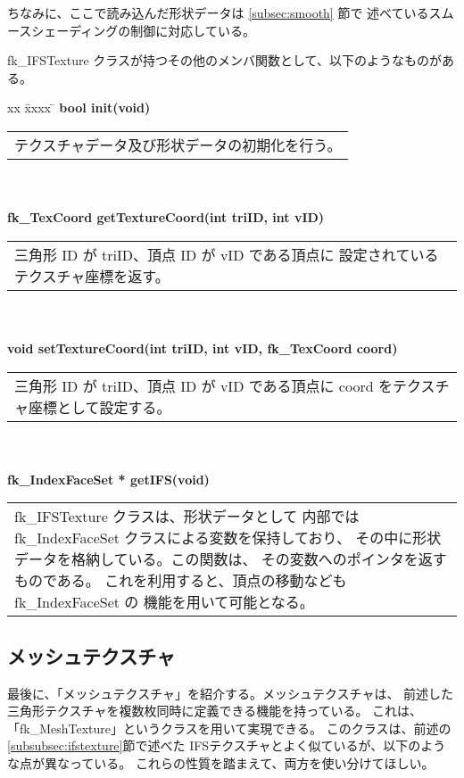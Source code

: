 ちなみに、ここで読み込んだ形状データは \ref{subsec:smooth} 節で
述べているスムースシェーディングの制御に対応している。

fk\_IFSTexture クラスが持つその他のメンバ関数として、以下のようなものがある。
\begin{tabbing}
xx \= xxxx \= \kill
\> \textbf{bool init(void)} \\
	\> \> \begin{tabular}{p{15cm}}
		テクスチャデータ及び形状データの初期化を行う。
	\end{tabular} \\ \\

\> \textbf{fk\_TexCoord getTextureCoord(int triID, int vID)} \\
	\> \> \begin{tabular}{p{15cm}}
		三角形 ID が triID、頂点 ID が vID である頂点に
		設定されているテクスチャ座標を返す。
	\end{tabular} \\ \\

\> \textbf{void setTextureCoord(int triID, int vID, fk\_TexCoord coord)} \\
	\> \> \begin{tabular}{p{15cm}}
		三角形 ID が triID、頂点 ID が vID である頂点に
		coord をテクスチャ座標として設定する。
	\end{tabular} \\ \\

\> \textbf{fk\_IndexFaceSet * getIFS(void)} \\
	\> \> \begin{tabular}{p{15cm}}
		fk\_IFSTexture クラスは、形状データとして
		内部では fk\_IndexFaceSet クラスによる変数を保持しており、
		その中に形状データを格納している。この関数は、
		その変数へのポインタを返すものである。
		これを利用すると、頂点の移動なども fk\_IndexFaceSet の
		機能を用いて可能となる。
	\end{tabular}
\end{tabbing}

\subsection{メッシュテクスチャ}
最後に、「メッシュテクスチャ」を紹介する。メッシュテクスチャは、
前述した三角形テクスチャを複数枚同時に定義できる機能を持っている。
これは、「fk\_MeshTexture」というクラスを用いて実現できる。
このクラスは、前述の \ref{subsubsec:ifstexture}節で述べた
IFSテクスチャとよく似ているが、以下のような点が異なっている。
これらの性質を踏まえて、両方を使い分けてほしい。

